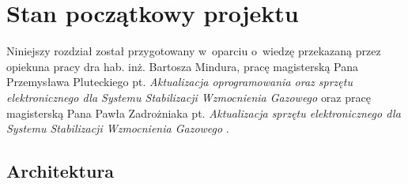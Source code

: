 
\chapter{Stan początkowy projektu}
\label{cha:pocz}

Niniejszy rozdział został przygotowany w~oparciu o~wiedzę przekazaną przez opiekuna pracy dra hab. inż. Bartosza Mindura, pracę magisterską Pana Przemysława Pluteckiego pt. \textit{Aktualizacja oprogramowania oraz sprzętu elektronicznego dla Systemu Stabilizacji Wzmocnienia Gazowego} \cite{PluteckiMgr} oraz pracę magisterską Pana Pawła Zadrożniaka pt. \textit{Aktualizacja sprzętu elektronicznego dla Systemu Stabilizacji Wzmocnienia Gazowego} \cite{ZadrozniakMgr}.

\section{Architektura}

